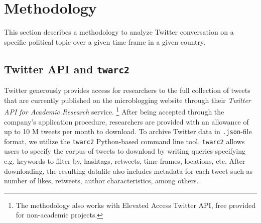 \section{Methodology}\label{sec_meth}
    
    This section describes a methodology to analyze Twitter conversation on a specific political topic over a given time frame in a given country. %
    
    
    
    \subsection{Twitter API and \texttt{twarc2}}\label{sec_dat}

    Twitter generously provides access for researchers to the full collection of tweets that are currently published on the microblogging website through their {\it Twitter API for Academic Research} service.%
    \footnote{The methodology also works with Elevated Access Twitter API, free provided for non-academic projects.}
    After being accepted through the company's application procedure, researchers are provided with an allowance of up to 10 M tweets per month to download. To archive Twitter data in \texttt{.json}-file format, we utilize the \texttt{twarc2} Python-based command line tool. %
    \texttt{twarc2} allows users to specify the corpus of tweets to download by writing queries specifying e.g. keywords to filter by, hashtags, retweets, time frames, locations, etc. After downloading, the resulting datafile also includes metadata for each tweet such as number of likes, retweets, author characteristics, among others.
        
